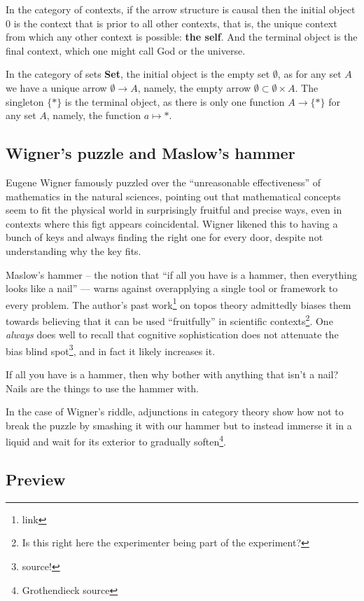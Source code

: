 \documentclass{article}
\begin{document}
In the category of contexts, if the arrow structure is causal then the initial object $0$ is the context that is prior to all other contexts, that is, the unique context from which any other context is possible: \textbf{the self}. And the terminal object is the final context, which one might call God or the universe.

In the category of sets \textbf{Set}, the initial object is the empty set $\emptyset$, as for any set $A$ we have a unique arrow $\emptyset \to A$, namely, the empty arrow $\emptyset \subset \emptyset \times A$. The singleton $\{ * \}$ is the terminal object, as there is only one function $A \to \{ * \}$ for any set $A$, namely, the function $a \mapsto *$.

\subsection{Wigner's puzzle and Maslow's hammer}
Eugene Wigner famously puzzled over the ``unreasonable effectiveness'' of mathematics in the natural sciences, pointing out that mathematical concepts seem to fit the physical world in surprisingly fruitful and precise ways, even in contexts where this figt appears coincidental. Wigner likened this to having a bunch of keys and always finding the right one for every door, despite not understanding why the key fits.

Maslow's hammer -- the notion that ``if all you have is a hammer, then everything looks like a nail'' --- warns against overapplying a single tool or framework to every problem. The author's past work\footnote{link} on topos theory admittedly biases them towards believing that it can be used ``fruitfully'' in scientific contexts\footnote{Is this right here the experimenter being part of the experiment?}. One \emph{always} does well to recall that cognitive sophistication does not attenuate the bias blind spot\footnote{source!}, and in fact it likely increases it.

If all you have is a hammer, then why bother with anything that isn't a nail? Nails are the things to use the hammer with.

In the case of Wigner's riddle, adjunctions in category theory show how not to break the puzzle by smashing it with our hammer but to instead immerse it in a liquid and wait for its exterior to gradually soften\footnote{Grothendieck source}.

\subsection{Preview}
\end{document}
